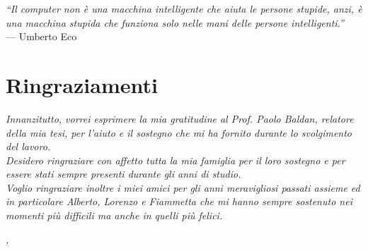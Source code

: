 
\cleardoublepage
{}
{}

\begin{flushright}{
	\slshape    
	``Il computer non è una macchina intelligente che aiuta le persone stupide, anzi, è una macchina stupida che funziona solo nelle mani delle persone intelligenti.''} \\ 
	\medskip
    --- Umberto Eco
\end{flushright}


\bigskip

\begingroup
\let\clearpage\relax
\let\cleardoublepage\relax
\let\cleardoublepage\relax

\chapter*{Ringraziamenti}

\noindent \textit{Innanzitutto, vorrei esprimere la mia gratitudine al Prof. Paolo Baldan, relatore della mia tesi, per l'aiuto e il sostegno che mi ha fornito durante lo svolgimento del lavoro.}\\

\noindent \textit{Desidero ringraziare con affetto tutta la mia famiglia per il loro sostegno e per essere stati sempre presenti durante gli anni di studio.}\\

\noindent \textit{Voglio ringraziare inoltre i miei amici per gli anni meravigliosi passati assieme ed in particolare Alberto, Lorenzo e Fiammetta che mi hanno sempre sostenuto nei momenti più difficili ma anche in quelli più felici.}\\
\bigskip

\noindent\textit{\myLocation, \myTime}
\hfill \myName

\endgroup

